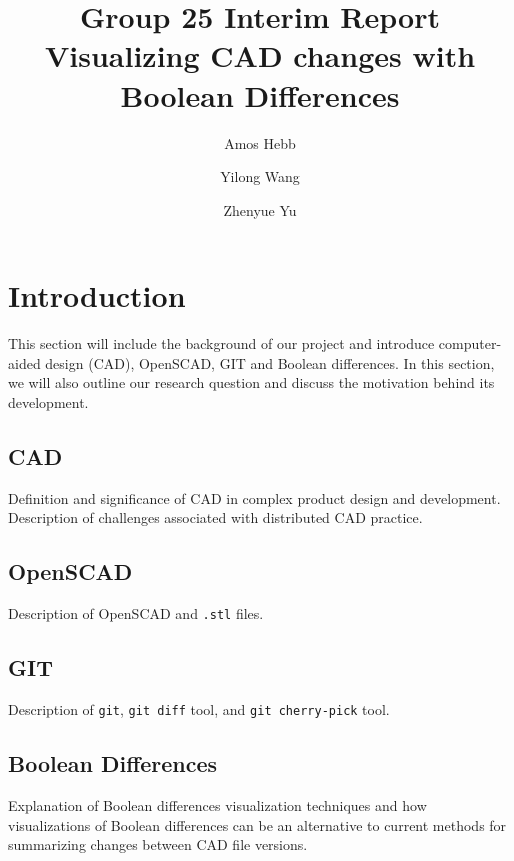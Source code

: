 \documentclass[sigconf,authorversion,nonacm]{acmart}
\begin{document}
\title{Group 25 Interim Report\\Visualizing CAD changes with Boolean Differences}

\author{Amos Hebb}
\author{Yilong Wang}
\author{Zhenyue Yu}
\makeatletter
\def\@ACM@checkaffil{%
	\if@ACM@instpresent\else
		\ClassWarningNoLine{\@classname}{No institution present for an affiliation}%
	\fi
	\if@ACM@citypresent\else
		\ClassWarningNoLine{\@classname}{No city present for an affiliation}%
	\fi
	\if@ACM@countrypresent\else
		\ClassWarningNoLine{\@classname}{No country present for an affiliation}%
	\fi
}
\makeatother

\maketitle

\section{Introduction}
This section will include the background of our project and introduce computer-aided design (CAD), OpenSCAD, GIT and Boolean differences. In this section, we will also outline our research question and discuss the motivation behind its development.
\subsection{CAD}
Definition and significance of CAD in complex product design and development. Description of challenges associated with distributed CAD practice.
\subsection{OpenSCAD}
Description of OpenSCAD and \texttt{.stl} files.
\subsection{GIT}
Description of \texttt{git}, \texttt{git diff} tool, and \texttt{git cherry-pick} tool.
\subsection{Boolean Differences}
Explanation of Boolean differences visualization techniques and how visualizations of Boolean differences can be an alternative to current methods for summarizing changes between CAD file versions.
\end{document}
